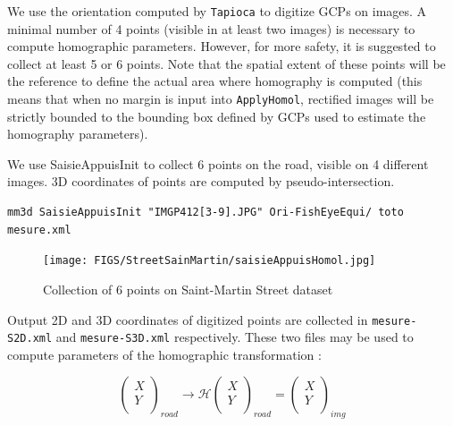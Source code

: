 \noindent We use the orientation computed by \texttt{Tapioca} to digitize GCPs on images. A minimal number of 4 points (visible in at least two images) is necessary to compute homographic parameters. However, for more safety, it is suggested to collect at least 5 or 6 points. Note that the spatial extent of these points will be the reference to define the actual area where homography is computed (this means that when no margin is input into \texttt{ApplyHomol}, rectified images will be strictly bounded to the bounding box defined by GCPs used to estimate the homography parameters). \newline

\noindent We use SaisieAppuisInit to collect 6 points on the road, visible on 4 different images. 3D coordinates of points are computed by pseudo-intersection. \newline

\begin{verbatim}
mm3d SaisieAppuisInit "IMGP412[3-9].JPG" Ori-FishEyeEqui/ toto mesure.xml
\end{verbatim}

\begin{figure}[!h]
	\begin{center}
		\texttt{[image: FIGS/StreetSainMartin/saisieAppuisHomol.jpg]}
		\caption{Collection of 6 points on Saint-Martin Street dataset}
	\end{center}	
\end{figure}

\noindent Output 2D and 3D coordinates of digitized points are collected in \texttt{mesure-S2D.xml} and \texttt{mesure-S3D.xml} respectively. These two files may be used to compute parameters of the homographic transformation :
\newline

$$\left(
\begin{array}{c}
X\\
Y\\
\end{array}
\right)_{road} \rightarrow \mathcal{H}\left(\begin{array}{c}
X\\
Y\\
\end{array}\right)_{road} = \left(\begin{array}{c}
X\\
Y\\
\end{array}\right)_{img}$$ \newline

